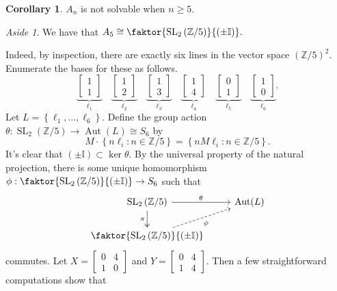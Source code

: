 \documentclass[10pt,letterpaper,cm]{nupset}
\theoremstyle{definition}
\theoremstyle{theorem}
\newtheorem{corollary}[definition]{Corollary}
\theoremstyle{remark}
\newtheorem*{aside}{Aside}
\newcommand{\I}{\mathbb I}
\newcommand{\Z}{\mathbb Z}
\newcommand{\1}{\mathbf{1}}
\newcommand{\0}{\vec 0}
\DeclareMathOperator*{\SL}{SL}
\DeclareMathOperator{\aut}{Aut}
\begin{document}
\begin{corollary}
$A_n$ is not solvable when $n\geq 5$.
\end{corollary}

\bigskip

\begin{aside}
 We have that $A_5 \cong \faktor{\SL_2\left(\Z/5\right)}{\left(\pm \I\right)}.$
 
 \smallskip
 
Indeed, by inspection, there are exactly six lines in the vector space $\left(\Z/5\right)^2$. Enumerate the bases for these as follows.
$$ \underbrace{\begin{bmatrix} 1 \\ 1  \end{bmatrix}}_{   \ell_1 }   
\quad  \underbrace{\begin{bmatrix} 1 \\ 2  \end{bmatrix}}_{  \ell_2 }  
\quad \underbrace{\begin{bmatrix} 1 \\ 3  \end{bmatrix}}_{   \ell_3 }  
 \quad  \underbrace{\begin{bmatrix} 1 \\  4 \end{bmatrix}}_{ \ell_4   }  
  \quad \underbrace{\begin{bmatrix} 0 \\ 1  \end{bmatrix}}_{  \ell_5  }  
   \quad \underbrace{\begin{bmatrix} 1 \\  0 \end{bmatrix}}_{ \ell_6   }   .$$
  Let $L= \left\{\ell_1, \ldots, \ell_6\right\}$. Define the group action $\theta : \SL_2(\Z /5)\to \aut(L)\cong S_6$ by $$M\cdot \left\{n\ell_i : n\in \Z/5\right\} = \left\{n M\ell_i : n \in \Z/5\right\}.$$
  It's clear that $\left(\pm \I\right) \subset \ker \theta$. By the universal property of the natural projection, there is some unique homomorphism $\phi : \faktor{\SL_2\left(\Z/5\right)}{\left(\pm \I\right)} \to S_6$ such that 
  \[
  \begin{tikzcd}
\SL_2\left(\Z/5\right) \arrow[r, "\theta"] \arrow[d, "\pi"', two heads] &\aut( L) \\
\faktor{\SL_2\left(\Z/5\right)}{\left(\pm \I\right)} \arrow[ru, "\phi"', dashed] & 
\end{tikzcd}
  \]
 commutes. Let $X= \begin{bmatrix} 0 & 4 \\ 1 & 0  \end{bmatrix}$ and $Y= \begin{bmatrix} 0 & 4 \\ 1 & 4  \end{bmatrix}$. Then a few straightforward computations show that 

\end{aside}
\end{document}
